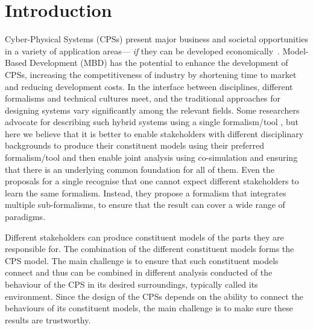 
\section{Introduction}\label{sec:intro}


Cyber-Physical Systems (CPSs) present major business and societal
opportunities in a variety of application areas--- \emph{if} they can be developed economically~\cite{Cengarle&13}. Model-Based Development (MBD) has the potential to enhance the development of CPSs, increasing the competitiveness of industry by shortening time to market and reducing development costs. In the interface between disciplines, different formalisms and technical cultures meet, and the traditional approaches for designing systems vary significantly among the relevant fields. Some researchers advocate for describing such hybrid systems using a single formalism/tool \cite{Ptolemaeus14,Platzer18}, but here we believe that it is better to enable stakeholders with different disciplinary backgrounds to produce their constituent models using their preferred formalism/tool and then enable joint analysis using co-simulation \cite{Gomes&18} and ensuring that there is an underlying common foundation for all of them.
Even the proposals for a single \cite{Ptolemaeus14,Platzer18} recognise that one cannot expect different stakeholders to learn the same formalism. Instead, they propose a formalism that integrates multiple sub-formalisms, to ensure that the result can cover a wide range of paradigms.

Different stakeholders can produce constituent models of the parts they are responsible for. The combination of the different constituent models forms the CPS model.
The main challenge is to ensure that such constituent models connect and thus can be combined in different analysis conducted of the behaviour of the CPS in its desired surroundings, typically called its environment.
Since the design of the CPSs depends on the ability to connect the behaviours of its constituent models, the main challenge is to make sure these results are trustworthy.

